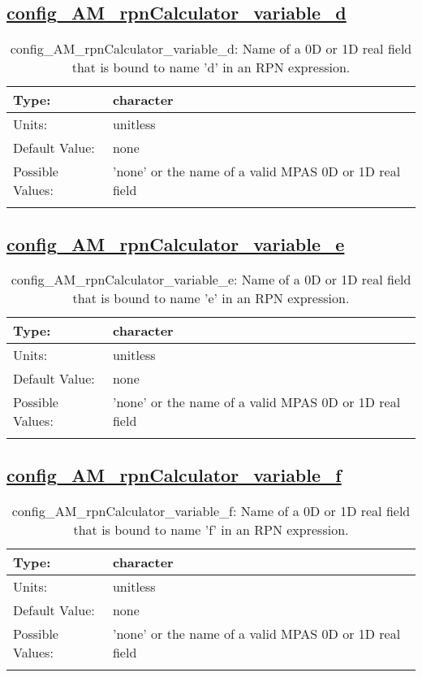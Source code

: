 \subsection[config\_AM\_rpnCalculator\_variable\_d]{\hyperref[sec:nm_tab_AM_rpnCalculator]{config\_AM\_rpnCalculator\_variable\_d}}
\label{subsec:nm_sec_config_AM_rpnCalculator_variable_d}
\begin{center}
\begin{longtable}{| p{2.0in} || p{4.0in} |}
    \hline
    Type: & character \\
    \hline
    Units: & \si{unitless} \\
    \hline
    Default Value: & none \\
    \hline
    Possible Values: & 'none' or the name of a valid MPAS 0D or 1D real field \\
    \hline
    \caption{config\_AM\_rpnCalculator\_variable\_d: Name of a 0D or 1D real field that is bound to name 'd' in an RPN expression.}
\end{longtable}
\end{center}
\subsection[config\_AM\_rpnCalculator\_variable\_e]{\hyperref[sec:nm_tab_AM_rpnCalculator]{config\_AM\_rpnCalculator\_variable\_e}}
\label{subsec:nm_sec_config_AM_rpnCalculator_variable_e}
\begin{center}
\begin{longtable}{| p{2.0in} || p{4.0in} |}
    \hline
    Type: & character \\
    \hline
    Units: & \si{unitless} \\
    \hline
    Default Value: & none \\
    \hline
    Possible Values: & 'none' or the name of a valid MPAS 0D or 1D real field \\
    \hline
    \caption{config\_AM\_rpnCalculator\_variable\_e: Name of a 0D or 1D real field that is bound to name 'e' in an RPN expression.}
\end{longtable}
\end{center}
\subsection[config\_AM\_rpnCalculator\_variable\_f]{\hyperref[sec:nm_tab_AM_rpnCalculator]{config\_AM\_rpnCalculator\_variable\_f}}
\label{subsec:nm_sec_config_AM_rpnCalculator_variable_f}
\begin{center}
\begin{longtable}{| p{2.0in} || p{4.0in} |}
    \hline
    Type: & character \\
    \hline
    Units: & \si{unitless} \\
    \hline
    Default Value: & none \\
    \hline
    Possible Values: & 'none' or the name of a valid MPAS 0D or 1D real field \\
    \hline
    \caption{config\_AM\_rpnCalculator\_variable\_f: Name of a 0D or 1D real field that is bound to name 'f' in an RPN expression.}
\end{longtable}
\end{center}
